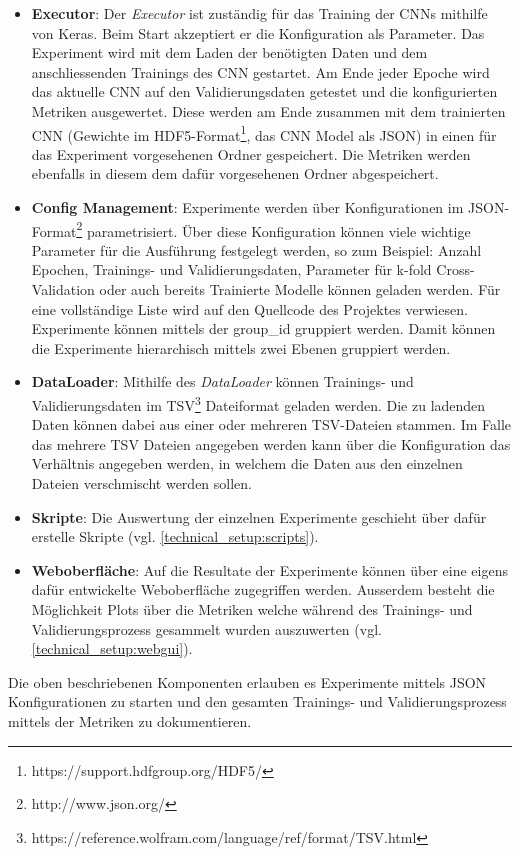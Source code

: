 \begin{itemize}
	\item \textbf{Executor}: Der \emph{Executor} ist zuständig für das Training der CNNs mithilfe von Keras. Beim Start akzeptiert er die Konfiguration als Parameter. Das Experiment wird mit dem Laden der benötigten Daten und dem anschliessenden Trainings des CNN gestartet. Am Ende jeder Epoche wird das aktuelle CNN auf den Validierungsdaten getestet und die konfigurierten Metriken ausgewertet. Diese werden am Ende zusammen mit dem trainierten CNN (Gewichte im HDF5-Format\footnote{https://support.hdfgroup.org/HDF5/}, das CNN Model als JSON) in einen für das Experiment vorgesehenen Ordner gespeichert. Die Metriken werden ebenfalls in diesem dem dafür vorgesehenen Ordner abgespeichert.
	\item \textbf{Config Management}: Experimente werden über Konfigurationen im JSON-Format\footnote{http://www.json.org/} parametrisiert. Über diese Konfiguration können viele wichtige Parameter für die Ausführung festgelegt werden, so zum Beispiel: Anzahl Epochen, Trainings- und Validierungsdaten, Parameter für k-fold Cross-Validation oder auch bereits Trainierte Modelle können geladen werden. Für eine vollständige Liste wird auf den Quellcode des Projektes verwiesen. Experimente können mittels der group{\_}id gruppiert werden. Damit können die Experimente hierarchisch mittels zwei Ebenen gruppiert werden.
	\item \textbf{DataLoader}: Mithilfe des \emph{DataLoader} können Trainings- und Validierungsdaten im TSV\footnote{https://reference.wolfram.com/language/ref/format/TSV.html} Dateiformat geladen werden. Die zu ladenden Daten können dabei aus einer oder mehreren TSV-Dateien stammen. Im Falle das mehrere TSV Dateien angegeben werden kann über die Konfiguration das Verhältnis angegeben werden, in welchem die Daten aus den einzelnen Dateien verschmischt werden sollen.
	\item \textbf{Skripte}: Die Auswertung der einzelnen Experimente geschieht über dafür erstelle Skripte (vgl. \ref{technical_setup:scripts}).
	\item \textbf{Weboberfläche}: Auf die Resultate der Experimente können über eine eigens dafür entwickelte Weboberfläche zugegriffen werden. Ausserdem besteht die Möglichkeit Plots über die Metriken welche während des Trainings- und Validierungsprozess gesammelt wurden auszuwerten (vgl. \ref{technical_setup:webgui}).
\end{itemize}
Die oben beschriebenen Komponenten erlauben es Experimente mittels JSON Konfigurationen zu starten und den gesamten Trainings- und Validierungsprozess mittels der Metriken zu dokumentieren.

